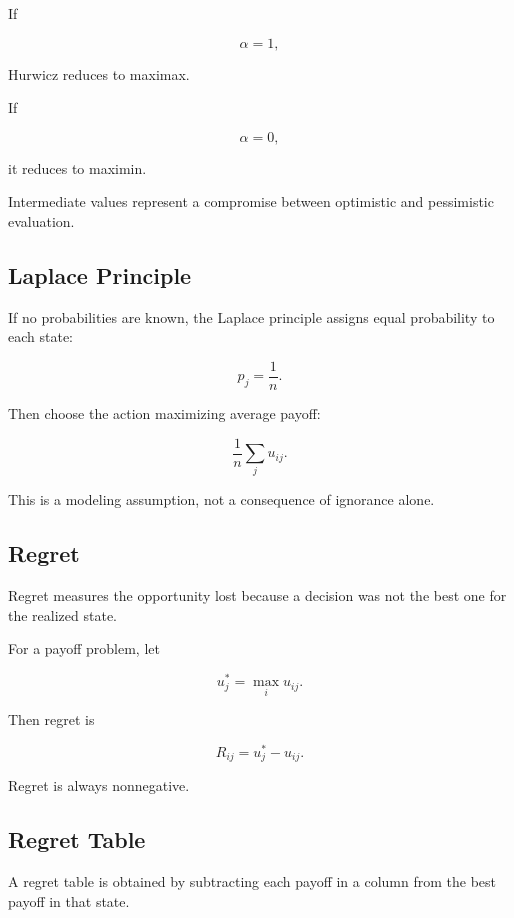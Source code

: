 If

\[
\alpha=1,
\]

Hurwicz reduces to maximax.

If

\[
\alpha=0,
\]

it reduces to maximin.

Intermediate values represent a compromise between optimistic and
pessimistic evaluation.

\subsection{Laplace Principle}
\label{subsec:laplace-principle}

If no probabilities are known, the Laplace principle assigns equal
probability to each state:

\[
\boxed{
p_j
=
\frac1n.
}
\]

Then choose the action maximizing average payoff:

\[
\boxed{
\frac1n
\sum_j
u_{ij}.
}
\]

This is a modeling assumption, not a consequence of ignorance alone.

\subsection{Regret}
\label{subsec:decision-regret}

Regret measures the opportunity lost because a decision was not the best
one for the realized state.

For a payoff problem, let

\[
u_j^*
=
\max_i
u_{ij}.
\]

Then regret is

\[
\boxed{
R_{ij}
=
u_j^*
-
u_{ij}.
}
\]

Regret is always nonnegative.

\subsection{Regret Table}
\label{subsec:regret-table}

A regret table is obtained by subtracting each payoff in a column from the
best payoff in that state.

